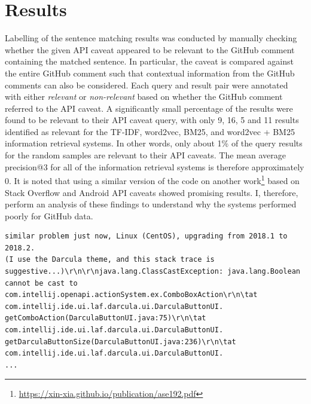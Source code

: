 \section{Results}
\label{sec:info-results}
Labelling of the sentence matching results was conducted by manually checking whether the given API caveat appeared to be relevant to the GitHub comment containing the matched sentence. In particular, the caveat is compared against the entire GitHub comment such that contextual information from the GitHub comments can also be considered. Each query and result pair were annotated with either \textit{relevant} or \textit{non-relevant} based on whether the GitHub comment referred to the API caveat. A significantly small percentage of the results were found to be relevant to their API caveat query, with only 9, 16, 5 and 11 results identified as relevant for the TF-IDF, word2vec, BM25, and word2vec + BM25 information retrieval systems. In other words, only about 1\% of the query results for the random samples are relevant to their API caveats. The mean average precision@3 for all of the information retrieval systems is therefore approximately 0. It is noted that using a similar version of the code on another work\footnote{\url{https://xin-xia.github.io/publication/ase192.pdf}} based on Stack Overflow and Android API caveats showed promising results. I, therefore, perform an analysis of these findings to understand why the systems performed poorly for GitHub data.\\

\clearpage

\begin{lstlisting}[label=error-log,caption={Example of a GitHub comment containing an error log from \url{https://github.com/ChrisRM/material-theme-jetbrains/issues/863}},float,frame=tb,numbers=none,language=None]
similar problem just now, Linux (CentOS), upgrading from 2018.1 to 2018.2. 
(I use the Darcula theme, and this stack trace is suggestive...)\r\n\r\njava.lang.ClassCastException: java.lang.Boolean cannot be cast to com.intellij.openapi.actionSystem.ex.ComboBoxAction\r\n\tat com.intellij.ide.ui.laf.darcula.ui.DarculaButtonUI.
getComboAction(DarculaButtonUI.java:75)\r\n\tat com.intellij.ide.ui.laf.darcula.ui.DarculaButtonUI.
getDarculaButtonSize(DarculaButtonUI.java:236)\r\n\tat com.intellij.ide.ui.laf.darcula.ui.DarculaButtonUI.
...
\end{lstlisting}

